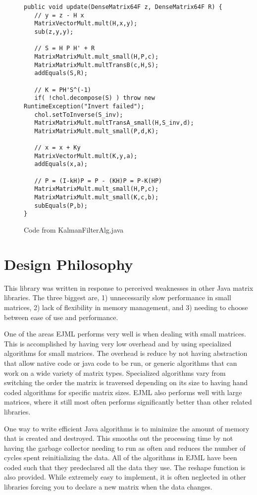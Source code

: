 \documentclass[12pt]{article}%
\begin{document}
\begin{figure}[h]
\begin{verbatim}
public void update(DenseMatrix64F z, DenseMatrix64F R) {
   // y = z - H x
   MatrixVectorMult.mult(H,x,y);
   sub(z,y,y);

   // S = H P H' + R
   MatrixMatrixMult.mult_small(H,P,c);
   MatrixMatrixMult.multTransB(c,H,S);
   addEquals(S,R);

   // K = PH'S^(-1)
   if( !chol.decompose(S) ) throw new RuntimeException("Invert failed");
   chol.setToInverse(S_inv);
   MatrixMatrixMult.multTransA_small(H,S_inv,d);
   MatrixMatrixMult.mult_small(P,d,K);

   // x = x + Ky
   MatrixVectorMult.mult(K,y,a);
   addEquals(x,a);

   // P = (I-kH)P = P - (KH)P = P-K(HP)
   MatrixMatrixMult.mult_small(H,P,c);
   MatrixMatrixMult.mult_small(K,c,b);
   subEquals(P,b);
}
\end{verbatim} 
\caption{\label{fig:update_alg}Code from KalmanFilterAlg.java}
\end{figure}

\appendix
\section{Design Philosophy}
This library was written in response to perceived weaknesses in other Java matrix libraries.  The three biggest are, 1) unnecessarily slow performance in small matrices, 2) lack of flexibility in memory management, and 3) needing to choose between ease of use and performance.

One of the areas EJML performs very well is when dealing with small matrices.  This is accomplished by having very low overhead and by using specialized algorithms for small matrices.  The overhead is reduce by not having abstraction that allow native code or java code to be run, or generic algorithms that can work on a wide variety of matrix types.  Specialized algorithms vary from switching the order the matrix is traversed depending on its size to having hand coded algorithms for specific matrix sizes.  EJML also performs well with large matrices, where it still most often performs significantly better than other related libraries.

One way to write efficient Java algorithms is to minimize the amount of memory that is created and destroyed.  This smooths out the processing time by not having the garbage collector needing to run as often and reduces the number of cycles spent reinitializing the data.  All of the algorithms in EJML have been coded such that they predeclared all the data they use.  The reshape function is also provided.  While extremely easy to implement, it is often neglected in other libraries forcing you to declare a new matrix when the data changes.
\end{document}
